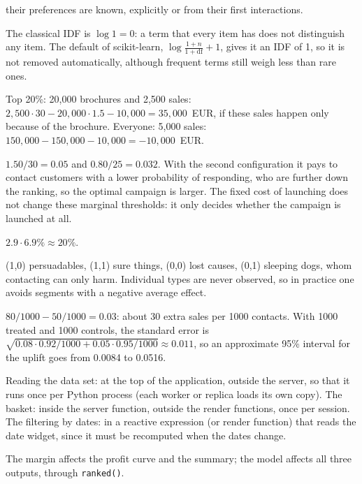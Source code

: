\begin{description}[font=\bfseries,leftmargin=0pt,itemsep=5pt]
        their preferences are known, explicitly or from their first interactions.
  \item[\ref{exr7:tfidf}] The classical IDF is $\log1=0$: a term that every item has does not distinguish any item. The default of
        scikit-learn, $\log\frac{1+n}{1+\mathrm{df}}+1$, gives it an IDF of 1, so it is not removed automatically, although
        frequent terms still weigh less than rare ones.
  \item[\ref{exr7:campaign}] Top 20\%: 20,000 brochures and 2,500 sales: $2{,}500\cdot30-20{,}000\cdot1.5-10{,}000=35{,}000$~EUR, if these sales happen only because of the brochure. Everyone: 5,000
        sales: $150{,}000-150{,}000-10{,}000=-10{,}000$~EUR.
  \item[\ref{exr7:threshold}] $1.50/30=0.05$ and $0.80/25=0.032$. With the second configuration it pays to contact customers with a lower
        probability of responding, who are further down the ranking, so the optimal campaign is larger. The fixed cost of launching does not change these marginal thresholds: it only decides
        whether the campaign is launched at all.
  \item[\ref{exr7:lift}] $2.9\cdot6.9\%\approx20\%$.
  \item[\ref{exr7:groups}] (1,0) persuadables, (1,1) sure things, (0,0) lost causes, (0,1) sleeping dogs, whom contacting can only harm. Individual types are
        never observed, so in practice one avoids segments with a negative average effect.
  \item[\ref{exr7:upliftcalc}] $80/1000-50/1000=0.03$: about 30 extra sales per 1000 contacts. With 1000 treated and 1000 controls, the standard
        error is $\sqrt{0.08\cdot0.92/1000+0.05\cdot0.95/1000}\approx0.011$, so an approximate 95\% interval for the uplift goes
        from 0.0084 to 0.0516.
  \item[\ref{exr7:place}] Reading the data set: at the top of the application, outside the server, so that it runs once
        per Python process (each worker or replica loads its own copy). The basket: inside the
        server function, outside the render functions, once per session. The filtering by dates: in a reactive expression (or render function)
        that reads the date widget, since it must be recomputed when the dates change.
  \item[\ref{exr7:graph}] The margin affects the profit curve and the summary; the model affects all three outputs, through \texttt{ranked()}.

\end{description}
